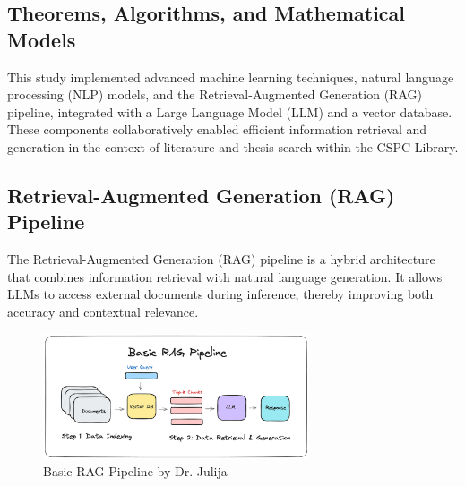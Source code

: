\begin{refsection}


\section{Theorems, Algorithms, and Mathematical Models}

This study implemented advanced machine learning techniques, natural language processing (NLP) models, and the Retrieval-Augmented Generation (RAG) pipeline, integrated with a Large Language Model (LLM) and a vector database. These components collaboratively enabled efficient information retrieval and generation in the context of literature and thesis search within the CSPC Library.

\subsection{Retrieval-Augmented Generation (RAG) Pipeline}

The Retrieval-Augmented Generation (RAG) pipeline is a hybrid architecture that combines information retrieval with natural language generation. It allows LLMs to access external documents during inference, thereby improving both accuracy and contextual relevance.

\begin{figure}[htbp]
    \centering
    \includegraphics[width=0.7\textwidth]{figures/rag.png}
    \caption{Basic RAG Pipeline by Dr. Julija}
    \label{fig:rag}
\end{figure}


\end{refsection}
